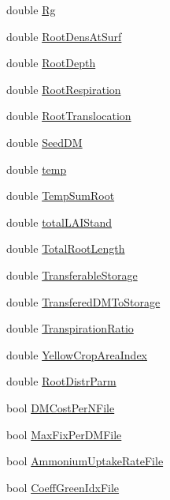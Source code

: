 \begin{DoxyCompactItemize}
double \hyperlink{classcrop_parameters_crop_aacdece0721006bcc6e6fa72f4c0e469e}{Rg}
\item 
double \hyperlink{classcrop_parameters_crop_a3295ee695393c8a0b26e51242933e159}{RootDensAtSurf}
\item 
double \hyperlink{classcrop_parameters_crop_a2967216a5aa3215b24ade9d0d530982b}{RootDepth}
\item 
double \hyperlink{classcrop_parameters_crop_a245f5c6d6830fdea1d7e703eb8584883}{RootRespiration}
\item 
double \hyperlink{classcrop_parameters_crop_a5998ca6234d7e53cc4c7d807a365d171}{RootTranslocation}
\item 
double \hyperlink{classcrop_parameters_crop_a8ed902c5f2dd72514971dd3096818d93}{SeedDM}
\item 
double \hyperlink{classcrop_parameters_crop_a27f1980534bbcd765c282d697988a2cd}{temp}
\item 
double \hyperlink{classcrop_parameters_crop_ab771e1be5fb3087b6b60491b26da2e33}{TempSumRoot}
\item 
double \hyperlink{classcrop_parameters_crop_a16f20202e4782320f871abde7e5deba8}{totalLAIStand}
\item 
double \hyperlink{classcrop_parameters_crop_a80beac3c72342122a25b4562a297a5bb}{TotalRootLength}
\item 
double \hyperlink{classcrop_parameters_crop_af3ddea0c4c371cb1a3a87167df7b3a78}{TransferableStorage}
\item 
double \hyperlink{classcrop_parameters_crop_aa4cde8ee9d66623add459a0251d721a2}{TransferedDMToStorage}
\item 
double \hyperlink{classcrop_parameters_crop_a59c121e6329e79b4784f3f31aeed4240}{TranspirationRatio}
\item 
double \hyperlink{classcrop_parameters_crop_a542987ecc271c49a49792a7b69fb92f9}{YellowCropAreaIndex}
\item 
double \hyperlink{classcrop_parameters_crop_aa6b8167a65339ebc5aee4efa4880a680}{RootDistrParm}
\item 
bool \hyperlink{classcrop_parameters_crop_a453e9378c9d3abae8b3b23ac4416bf64}{DMCostPerNFile}
\item 
bool \hyperlink{classcrop_parameters_crop_adfe5af221285232e8a50669ccb0c8064}{MaxFixPerDMFile}
\item 
bool \hyperlink{classcrop_parameters_crop_a5f32e935a8316b1bbce46edcb4ff4c6c}{AmmoniumUptakeRateFile}
\item 
bool \hyperlink{classcrop_parameters_crop_a69aa50a0093faaec965b3105ead94841}{CoeffGreenIdxFile}

\end{DoxyCompactItemize}
